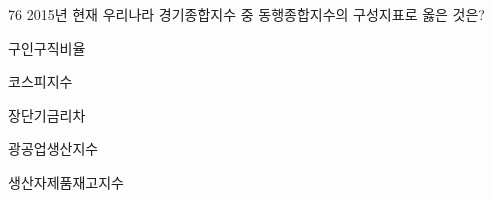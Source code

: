 \begin{question}{76}
2015년 현재 우리나라 경기종합지수 중 동행종합지수의 구성지표로 옳은 것은?
\begin{choices}
  \item 구인구직비율
  \item 코스피지수
  \item 장단기금리차
  \item 광공업생산지수
  \item 생산자제품재고지수
\end{choices}
\end{question}
